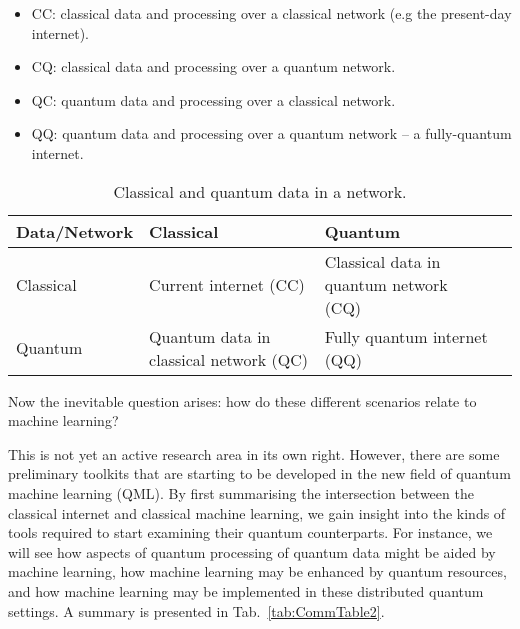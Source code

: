\begin{itemize}
\item CC: classical data and processing over a classical network (e.g the present-day internet).
\item CQ: classical data and processing over a quantum network.
\item QC: quantum data and processing over a classical network.
\item QQ: quantum data and processing over a quantum network -- a fully-quantum internet.
\end{itemize}

\startnormtable
\begin{table*}[htbp!]
\begin{tabular}{|l|l|l|l|}
\hline
Data/Network & Classical & Quantum \\
\hline
\hline
Classical & Current internet (CC) & Classical data in quantum network (CQ) \\
Quantum & Quantum data in classical network (QC) & Fully quantum internet (QQ)\\
\hline
\end{tabular}
\captionspacetab \caption{\label{tab:CommTable}Classical and quantum data in a network.}
\end{table*}

Now the inevitable question arises: how do these different scenarios relate to machine learning?

This is not yet an active research area in its own right. However, there are some preliminary toolkits that are starting to be developed in the new field of quantum machine learning (QML). By first summarising the intersection between the classical internet and classical machine learning, we gain insight into the kinds of tools required to start examining their quantum counterparts. For instance, we will see how aspects of quantum processing of quantum data might be aided by machine learning, how machine learning may be enhanced by quantum resources, and how machine learning may be implemented in these distributed quantum settings. A summary is presented in Tab.~\ref{tab:CommTable2}. 

